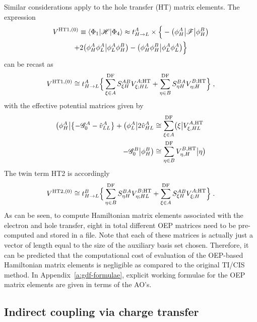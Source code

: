 Similar considerations apply to the hole transfer (HT) matrix elements.
The expression
%
\begin{multline}\label{e:v0-ht1}
 V^{{\rm HT1},(0)} \equiv \left< \Phi_1 \vert \mathscr{H} \vert \Phi_4 \right> \approx 
 t_{H\rightarrow L}^A \times \Big\{ 
-\big(\phi_H^A \big| \mathscr{F} \big| \phi_H^B \big) \\
   + 2 \big( \phi_H^A \phi_L^A \big| \phi_L^A \phi_H^B \big) - \big( \phi_H^A \phi_H^B \big| \phi_L^A \phi_L^A \big) 
 \Big\} 
\end{multline}
%
can be recast as
%
\begin{multline}\label{e:v0-ht1-oep}
 V^{{\rm HT1},(0)} \cong t_{H\rightarrow L}^A \Big\{ 
 \sum_{\xi\in A}^{\rm DF} S_{\xi H}^{AB} V^{A;{\rm HT}}_{\xi;HL} +
 \sum_{\eta\in B}^{\rm DF} S_{\eta H}^{BA} V^{B;{\rm HT}}_{\eta;H}
 \Big\} \;,
\end{multline}
%
with the effective potential matrices given by
%
%
\begin{subequations}
\begin{align}
 \bigl( {\phi_H^A} \bigl\lvert \left\{ -\mathscr{G}_0^A - \hat{v}^A_{LL} \right\}
 + \bigl( {\phi_L^A} \bigl\lvert 2 \hat{v}^A_{HL} 
 &\cong \sum_{\xi\in A}^{\rm DF} \bigl( {\xi} \bigl\lvert V^{A,{\rm HT}}_{\xi,HL} \\
 -\mathscr{G}_0^B \bigr\rvert {\phi_H^B} \bigr) &\cong \sum_{\eta\in B}^{\rm DF} V^{B,{\rm HT}}_{\eta,H} \bigr\rvert {\eta} \bigr) 
\end{align}
\end{subequations}
%
The twin term HT2 is accordingly
%
\begin{multline}\label{e:v0-ht2-oep}
 V^{{\rm HT2},(0)} \cong t_{H\rightarrow L}^B \Big\{ 
 \sum_{\eta\in B}^{\rm DF} S_{\eta H}^{BA} V^{B;{\rm HT}}_{\eta;HL} +
 \sum_{\xi\in A}^{\rm DF} S_{\xi H}^{AB} V^{A;{\rm HT}}_{\xi;H}
 \Big\} \;.
\end{multline}
%
As can be seen, to compute Hamiltonian matrix elements
associated with the electron and hole transfer, eight in total
different OEP matrices need to be pre\hyp{}computed and stored in a file.
Note that each of these matrices is actually just a vector of length
equal to the size of the auxiliary basis set chosen. Therefore,
it can be predicted that the computational cost of evaluation of the OEP\hyp{}based Hamiltonian
matrix elements is negligible as compared to the original TI/CIS method.
In Appendix~\ref{a:gdf-formulae}, explicit working formulae
for the OEP matrix elements are given in terms of the AO's.

\subsection{\label{s:2.2}Indirect coupling via charge transfer}

